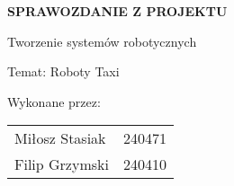 
\begin{titlepage}

    \selectfont
    \centering
    
    \vspace*{\baselineskip}
    \vspace{1\baselineskip}
    
    \begingroup
        \fontsize{25pt}{12pt}
        \selectfont
        \textbf{SPRAWOZDANIE Z PROJEKTU}
    \endgroup
    
    \vspace{4\baselineskip}
    
    \begingroup
        \fontsize{21pt}{12pt} \selectfont
        Tworzenie systemów robotycznych
    \endgroup
    
    \vspace{1\baselineskip}
    
    \begingroup
        \fontsize{18pt}{18pt}
        \selectfont
        Temat: Roboty Taxi
    \endgroup


    \vspace{6\baselineskip}
    
    \begin{flushleft}
    \begingroup
        \fontsize{16pt}{10pt}\selectfont
        Wykonane przez:
    \endgroup
    \vspace{0.8\baselineskip}
    
    
    {\fontsize{14pt}{10pt}\selectfont
    \begin{tabular}{ll}
        \hspace{1em}\vspace{0.6em}
        Miłosz Stasiak  & 240471\\
        \hspace{1em}\vspace{0.6em}
        Filip Grzymski & 240410\\
    \end{tabular}
    }%
    


    \end{flushleft}
    

    
    \vfill
    
\end{titlepage}
